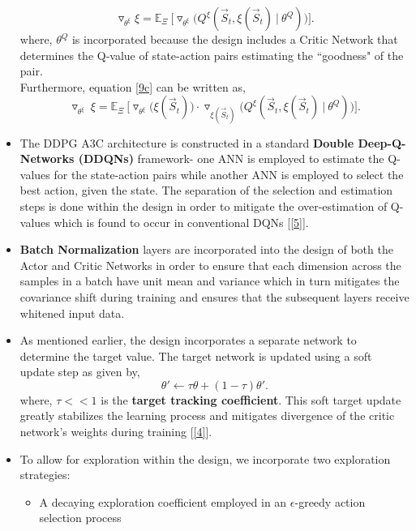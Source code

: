 \documentclass{article}
\begin{document}
\begin{itemize}
\begin{equation}
        \triangledown_{\theta^{\xi}} \xi = \mathbb{E}_{\Xi}\ \Big[\triangledown_{\theta^{\xi}}\Big(Q^{\xi}(\vec{S}_t, \xi(\vec{S}_{t})\ |\ \theta^{Q})\Big)\Big].
    \end{equation}
    where, $\theta^{Q}$ is incorporated because the design includes a Critic Network that determines the Q-value of state-action pairs estimating the ``goodness" of the pair.
    \\Furthermore, equation \eqref{9c} can be written as,
    \begin{equation}\label{9d}
        \triangledown_{\theta^{\xi}}\ \xi = \mathbb{E}_{\Xi}\ \Big[\triangledown_{\theta^{\xi}} \Big(\xi(\vec{S}_t)\Big) \cdot \triangledown_{\xi(\vec{S}_t)} \Big(Q^{\xi}(\vec{S}_t, \xi(\vec{S}_t)\ |\ \theta^{Q})\Big)\Big].
    \end{equation}
    \item The DDPG A3C architecture is constructed in a standard \textbf{Double Deep-Q-Networks (DDQNs)} framework- one ANN is employed to estimate the Q-values for the state-action pairs while another ANN is employed to select the best action, given the state. The separation of the selection and estimation steps is done within the design in order to mitigate the over-estimation of Q-values which is found to occur in conventional DQNs [\ref{5}].
    \item \textbf{Batch Normalization} layers are incorporated into the design of both the Actor and Critic Networks in order to ensure that each dimension across the samples in a batch have unit mean and variance which in turn mitigates the covariance shift during training and ensures that the subsequent layers receive whitened input data.
    \item As mentioned earlier, the design incorporates a separate network to determine the target value. The target network is updated using a soft update step as given by,
    \begin{equation}
        \theta' \longleftarrow \tau \theta + (1 - \tau) \theta'.
    \end{equation}
    where, $\tau << 1$ is the \textbf{target tracking coefficient}. This soft target update greatly stabilizes the learning process and mitigates divergence of the critic network's weights during training [\ref{4}].
    \item To allow for exploration within the design, we incorporate two exploration strategies:
    \begin{itemize}
        \item A decaying exploration coefficient employed in an $\epsilon$-greedy action selection process

\end{itemize}
\end{itemize}
\end{document}
